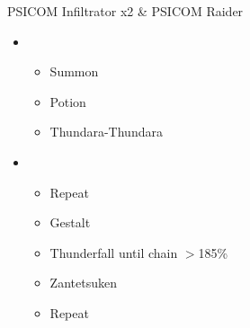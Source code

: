 \begin{battle}[0:15]{PSICOM Infiltrator x2 \& PSICOM Raider}
	\begin{itemize}
		\item \first
		    \begin{itemize}
			    \item Summon
			    \item Potion
			    \item Thundara-Thundara
		    \end{itemize}
		\item \sixth
			\begin{itemize}
				\item Repeat
				\item Gestalt
				\item Thunderfall until chain $>$185\%
				\item Zantetsuken
				\item Repeat
			\end{itemize}
	\end{itemize}
	 
\end{battle}

\renewcommand{\first}{[1] Tide Turner (\syn/\sab)}
\renewcommand{\second}{[2] War and Peace (\com/\med)}
\renewcommand{\third}{[3] Slash \& Burn (\com/\rav)}
\renewcommand{\fourth}{[4] Dualcasting (\rav/\rav)}
\renewcommand{\fifth}{[5] Undermine (\rav/\sab)}
\renewcommand{\sixth}{[6] Divide \& Conquer (\com/\sab)}

